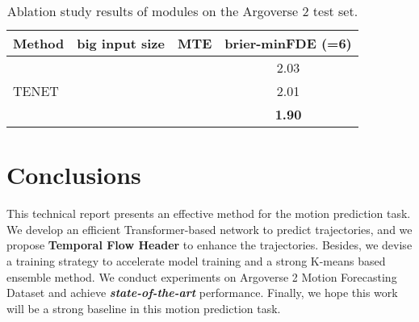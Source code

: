 \documentclass[10pt,twocolumn,letterpaper]{article}
\begin{document}
\begin{table}
  \caption{Ablation study results of modules on the Argoverse 2 test set.}
  \label{ablation}
  \centering
  \begin{tabular}{llll}
    \toprule
    Method &  \multicolumn{1}{c}{big input size} &  \multicolumn{1}{c}{MTE} &  \multicolumn{1}{c}{brier-minFDE (=6)} \\
    \midrule
    \multirow{3}{*}{TENET} & \multicolumn{1}{c}{ } & \multicolumn{1}{c}{ } & \multicolumn{1}{c}{2.03}  \\
      & \multicolumn{1}{c}{} & \multicolumn{1}{c}{ } & \multicolumn{1}{c}{2.01}  \\
      & \multicolumn{1}{c}{} & \multicolumn{1}{c}{} & \multicolumn{1}{c}{\textbf{1.90}}  \\

    \bottomrule
  \end{tabular}
\end{table}

\section{Conclusions}
This technical report presents an effective method for the motion prediction task. We develop an efficient Transformer-based network to predict trajectories, and we propose \textbf{Temporal Flow Header} to enhance the trajectories. Besides, we devise a training strategy to accelerate model training and a strong K-means based ensemble method. We conduct experiments on Argoverse 2 Motion Forecasting Dataset \cite{wilson2021argoverse} and achieve \textbf{\textit{state-of-the-art}} performance. Finally, we hope this work will be a strong baseline in this motion prediction task.
{\small


}
\end{document}

